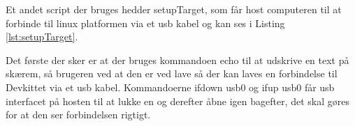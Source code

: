 Et andet script der bruges hedder setupTarget, som får host computeren til at forbinde til linux platformen via et usb kabel og kan ses i Listing \ref{lst:setupTarget}.



Det første der sker er at der bruges kommandoen echo til at udskrive en text på skærem, så brugeren ved at den er ved lave så der kan laves en forbindelse til Devkittet via et usb kabel. Kommandoerne ifdown usb0 og ifup usb0 får usb interfacet på hosten til at lukke en og derefter åbne igen bagefter, det skal gøres for at den ser forbindelsen rigtigt.
